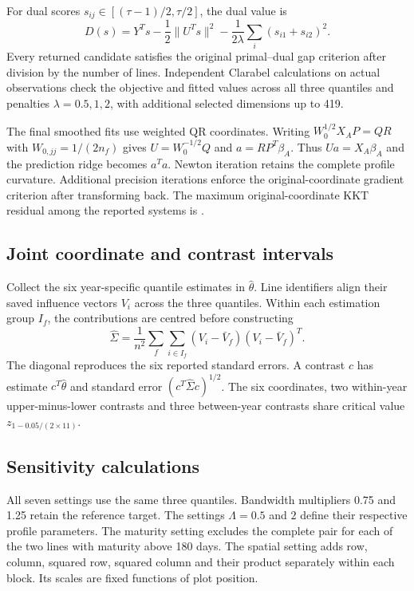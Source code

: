 For dual scores $s_{ij}\in[(\tau-1)/2,\tau/2]$, the dual value is
\[
 D(s)=Y^Ts-\frac12\lVert U^Ts\rVert^2
      -\frac1{2\lambda}\sum_i(s_{i1}+s_{i2})^2.
\]
Every returned candidate satisfies the original primal--dual gap
criterion after division by the number of lines. Independent
Clarabel calculations on actual observations check the objective
and fitted values across all three quantiles and penalties
$\lambda=0.5,1,2$, with additional selected dimensions up to 419.

The final smoothed fits use weighted QR coordinates. Writing
$W_0^{1/2}X_AP=QR$ with $W_{0,jj}=1/(2n_f)$ gives
$U=W_0^{-1/2}Q$ and $a=RP^T\beta_A$. Thus $Ua=X_A\beta_A$ and
the prediction ridge becomes $a^Ta$. Newton iteration retains the
complete profile curvature. Additional precision iterations enforce
the original-coordinate gradient criterion after transforming back.
The maximum original-coordinate KKT residual among the reported
systems is \texttt{\SoyMaxKKT{}}.

\subsection{Joint coordinate and contrast intervals}

Collect the six year-specific quantile estimates in $\widehat\theta$.
Line identifiers align their saved influence vectors $V_i$ across
the three quantiles. Within each estimation group $I_f$, the
contributions are centred before constructing
\[
 \widehat\Sigma=\frac1{n^2}\sum_f\sum_{i\in I_f}
 (V_i-\bar V_f)(V_i-\bar V_f)^T.
\]
The diagonal reproduces the six reported standard errors. A contrast
$c$ has estimate $c^T\widehat\theta$ and standard error
$(c^T\widehat\Sigma c)^{1/2}$. The six coordinates, two within-year
upper-minus-lower contrasts and three between-year contrasts share
critical value $z_{1-0.05/(2\times11)}$.




\subsection{Sensitivity calculations}

All seven settings use the same three quantiles. Bandwidth
multipliers 0.75 and 1.25 retain the reference target. The settings
$\Lambda=0.5$ and $2$ define their respective profile parameters.
The maturity setting excludes the complete pair for each of the two
lines with maturity above 180 days. The spatial setting adds row,
column, squared row, squared column and their product separately
within each block. Its scales are fixed functions of plot position.

